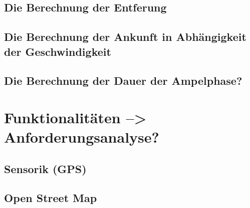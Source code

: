 \subsection{Die Berechnung der Entferung}
\subsection{Die Berechnung der Ankunft in Abhängigkeit der Geschwindigkeit}
\subsection{Die Berechnung der Dauer der Ampelphase?}
\section{Funktionalitäten --> Anforderungsanalyse?}
\subsection{Sensorik (GPS)}
\subsection{Open Street Map}
